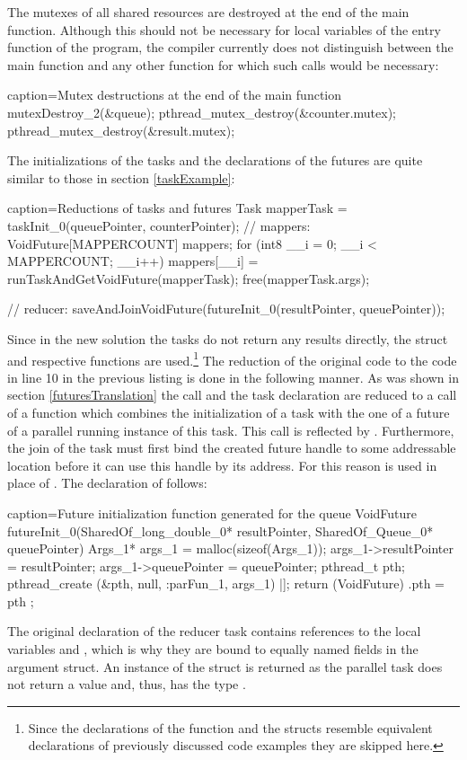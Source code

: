 The mutexes of all shared resources are destroyed at the end of the main function. Although this should not be necessary for local variables of the entry function of the program, the compiler currently does not distinguish between the main function and any other function for which such calls would be necessary:
\begin{ccode}{caption=Mutex destructions at the end of the main function}
mutexDestroy_2(&queue); 
pthread_mutex_destroy(&counter.mutex); 
pthread_mutex_destroy(&result.mutex);
\end{ccode}
The initializations of the tasks and the declarations of the futures are quite similar to those in section \ref{taskExample}:
\begin{ccode}{caption=Reductions of tasks and futures}
Task mapperTask = taskInit_0(queuePointer, counterPointer);
// mappers:
VoidFuture[MAPPERCOUNT] mappers; 
for (int8 __i = 0; __i < MAPPERCOUNT; __i++) { 
  mappers[__i] = runTaskAndGetVoidFuture(mapperTask); 
}
free(mapperTask.args);

// reducer:
saveAndJoinVoidFuture(futureInit_0(resultPointer, queuePointer));
\end{ccode}

Since in the new solution the tasks do not return any results directly, the  struct and respective functions are used.\footnote{Since the declarations of the  function and the  structs resemble equivalent declarations of previously discussed code examples they are skipped here.} The reduction of the original code  to the code in line 10 in the previous listing is done in the following manner. As was shown in section \ref{futuresTranslation} the  call and the task declaration are reduced to a call of a function which combines the initialization of a task with the one of a future of a parallel running instance of this task. This call is reflected by . Furthermore, the join of the task must first bind the created future handle to some addressable location before it can use this handle by its address. For this reason  is used in place of . The declaration of  follows:
\begin{ccode}{caption=Future initialization function generated for the queue}
VoidFuture futureInit_0(SharedOf_long_double_0* resultPointer, SharedOf_Queue_0* queuePointer) { 
  Args_1* args_1 = malloc(sizeof(Args_1)); 
  args_1->resultPointer = resultPointer; 
  args_1->queuePointer = queuePointer; 
  pthread_t pth; 
  pthread_create (&pth, null, :parFun_1, args_1) |]; 
  return (VoidFuture){ .pth = pth }; 
}
\end{ccode}
The original declaration of the reducer task contains references to the local variables  and , which is why they are bound to equally named fields in the argument struct. An instance of the  struct is returned as the parallel task does not return a value and, thus, has the type .

